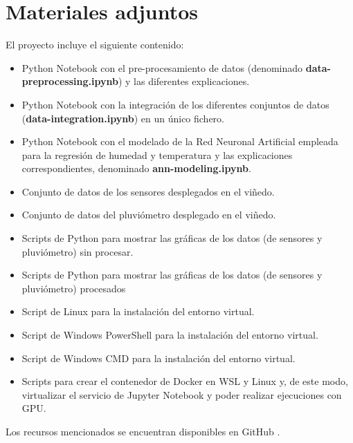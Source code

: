 \section{Materiales adjuntos}
El proyecto incluye el siguiente contenido:
\begin{itemize}
    \item Python Notebook con el pre-procesamiento de datos (denominado \textbf{data-preprocessing.ipynb}) y 
        las diferentes explicaciones.
    \item Python Notebook con la integración de los diferentes conjuntos de datos (\textbf{data-integration.ipynb})
    en un único fichero.
    \item Python Notebook con el modelado de la Red Neuronal Artificial empleada para la regresión
        de humedad y temperatura y las explicaciones correspondientes, denominado \textbf{ann-modeling.ipynb}.
    \item Conjunto de datos de los sensores desplegados en el viñedo.
    \item Conjunto de datos del pluviómetro desplegado en el viñedo.
    \item Scripts de Python para mostrar las gráficas de los datos (de sensores y pluviómetro) sin procesar.
    \item Scripts de Python para mostrar las gráficas de los datos (de sensores y pluviómetro) procesados
    \item Script de Linux para la instalación del entorno virtual.
    \item Script de Windows PowerShell para la instalación del entorno virtual.
    \item Script de Windows CMD para la instalación del entorno virtual.
    \item Scripts para crear el contenedor de Docker en WSL y Linux y, de este modo, virtualizar el servicio de Jupyter Notebook
        y poder realizar ejecuciones con GPU.
\end{itemize}
Los recursos mencionados se encuentran disponibles en GitHub \cite{gabriel:2023}.
